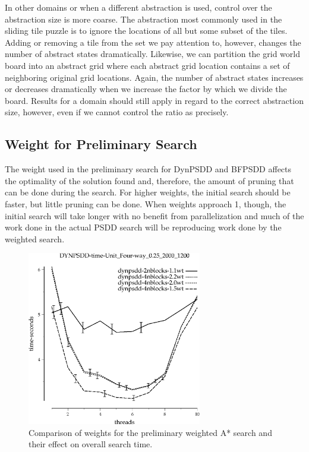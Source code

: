 \documentclass{article}
\begin{document}
In other domains or when a different abstraction is used, control over the abstraction size is more coarse. The abstraction most commonly used in the sliding tile puzzle is to ignore the locations of all but some subset of the tiles. Adding or removing a tile from the set we pay attention to, however, changes the number of abstract states dramatically. Likewise, we can partition the grid world board into an abstract grid where each abstract grid location contains a set of neighboring original grid locations. Again, the number of abstract states increases or decreases dramatically when we increase the factor by which we divide the board. Results for a domain should still apply in regard to the correct abstraction size, however, even if we cannot control the ratio as precisely.
\subsection{Weight for Preliminary Search}
The weight used in the preliminary search for DynPSDD and BFPSDD affects the optimality of the solution found and, therefore, the amount of pruning that can be done during the search. For higher weights, the initial search should be faster, but little pruning can be done. When weights approach 1, though, the initial search will take longer with no benefit from parallelization and much of the work done in the actual PSDD search will be reproducing work done by the weighted search.

\begin{figure}[h!]
\includegraphics[width=3in]{../graphs/grid_unit_four-way_0.25_2000_1200/DYNPSDD-time-Unit_Four-way_0.25_2000_1200.eps}
\caption{Comparison of weights for the preliminary weighted A* search and their effect on overall search time.}
\label{fig:DynPSDD-weight-grid}
\end{figure}
\end{document}
